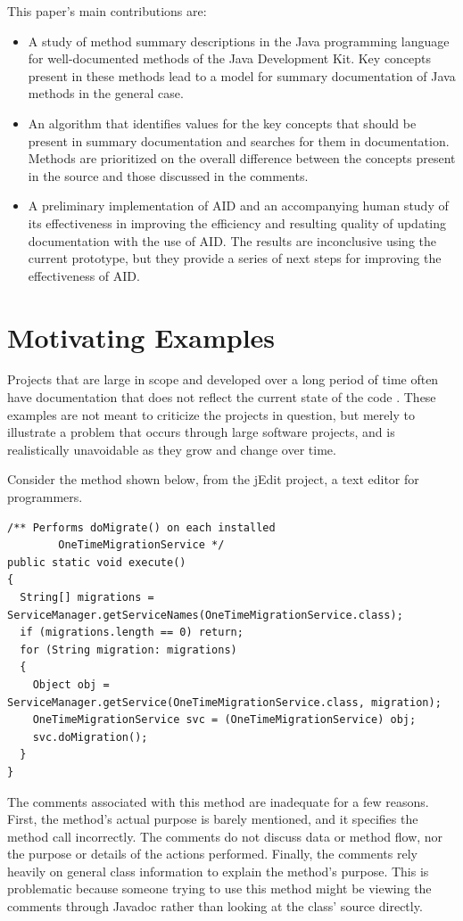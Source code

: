 \documentclass[preprint]{sigplanconf}
\begin{document}
This paper's main contributions are:
\begin{itemize}
\item A study of method summary descriptions in the Java programming language for well-documented methods of the Java Development Kit. Key concepts present in these methods lead to a model for summary documentation of Java methods in the general case.
\item An algorithm that identifies values for the key concepts that should be present in summary documentation and searches for them in documentation. Methods are prioritized on the overall difference between the concepts present in the source and those discussed in the comments.
\item A preliminary implementation of AID and an accompanying human study of its effectiveness in improving the efficiency and resulting quality of updating documentation with the use of AID. The results are inconclusive using the current prototype, but they provide a series of next steps for improving the effectiveness of AID.
\end{itemize}

\section{Motivating Examples}
Projects that are large in scope and developed over a long period of time often have documentation that does not reflect the current state of the code \cite{lethbridge}. These examples are not meant to criticize the projects in question, but merely to illustrate a problem that occurs through large software projects, and is realistically unavoidable as they grow and change over time.

Consider the method shown below, from the jEdit project, a text editor for programmers.

\begin{lstlisting}
/** Performs doMigrate() on each installed 
        OneTimeMigrationService */
public static void execute()
{
  String[] migrations = ServiceManager.getServiceNames(OneTimeMigrationService.class);
  if (migrations.length == 0) return;
  for (String migration: migrations)
  {
    Object obj = ServiceManager.getService(OneTimeMigrationService.class, migration);
    OneTimeMigrationService svc = (OneTimeMigrationService) obj;
    svc.doMigration();
  }
}
\end{lstlisting}

The comments associated with this method are inadequate for a few reasons. First, the method's actual purpose is barely mentioned, and it specifies the method call incorrectly. The comments do not discuss data or method flow, nor the purpose or details of the actions performed. Finally, the comments rely heavily on general class information to explain the method's purpose. This is problematic because someone trying to use this method might be viewing the comments through Javadoc rather than looking at the class' source directly.
\end{document}
